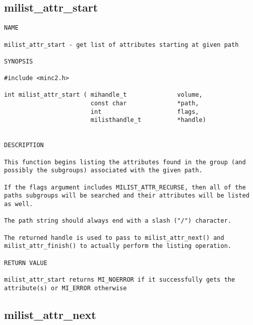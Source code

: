 \documentclass{article}
\begin{document}
\subsection{milist\_attr\_start}

\begin{verbatim}
NAME 

milist_attr_start - get list of attributes starting at given path

SYNOPSIS

#include <minc2.h>

int milist_attr_start ( mihandle_t              volume, 
                        const char              *path,
                        int                     flags,
                        milisthandle_t          *handle)

                                                
DESCRIPTION

This function begins listing the attributes found in the group (and
possibly the subgroups) associated with the given path.

If the flags argument includes MILIST_ATTR_RECURSE, then all of the 
paths subgroups will be searched and their attributes will be listed
as well.

The path string should always end with a slash ("/") character.

The returned handle is used to pass to milist_attr_next() and 
milist_attr_finish() to actually perform the listing operation.

RETURN VALUE

milist_attr_start returns MI_NOERROR if it successfully gets the
attribute(s) or MI_ERROR otherwise

\end{verbatim}

\subsection{milist\_attr\_next}
\end{document}
